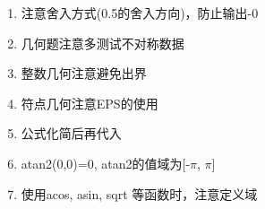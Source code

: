 \begin{enumerate}
	\item 注意舍入方式(0.5的舍入方向)，防止输出-0
	\item 几何题注意多测试不对称数据
	\item 整数几何注意避免出界
	\item 符点几何注意EPS的使用
	\item 公式化简后再代入
	\item atan2(0,0)=0, atan2的值域为[-$\pi$, $\pi$]
	\item 使用acos, asin, sqrt 等函数时，注意定义域
\end{enumerate}

